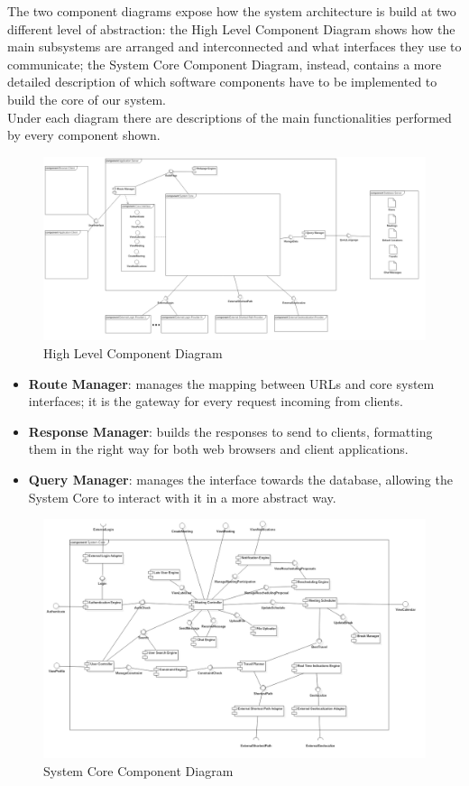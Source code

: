 The two component diagrams expose how the system architecture is build at two different level of abstraction: the High Level Component Diagram shows how the main subsystems are arranged and interconnected and what interfaces they use to communicate; the System Core Component Diagram, instead, contains a more detailed description of which software components have to be implemented to build the core of our system.\\
Under each diagram there are descriptions of the main functionalities performed by every component shown.

\begin{figure}[!h]
\centering\includegraphics[width=\textwidth]{Images/UMLDiagrams/HighLevelComponentDiagram.png}
\caption{High Level Component Diagram}
\end{figure}

\begin{itemize}
\item \textbf{Route Manager}: manages the mapping between URLs and core system interfaces; it is the gateway for every request incoming from clients.
\item \textbf{Response Manager}: builds the responses to send to clients, formatting them in the right way for both web browsers and client applications.
\item \textbf{Query Manager}: manages the interface towards the database, allowing the System Core to interact with it in a more abstract way.
\end{itemize}

\begin{figure}[!h]
\centering\includegraphics[width=\textwidth]{Images/UMLDiagrams/ApplicationComponentDiagram.png}
\caption{System Core Component Diagram}
\end{figure}

